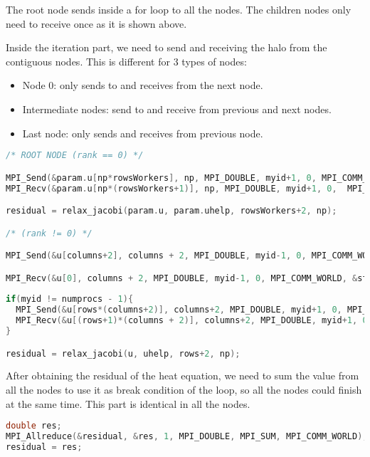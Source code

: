 \documentclass[a4paper, 10pt]{article}
\begin{document}
The root node sends inside a for loop to all the nodes. The children nodes only need to receive once as it is shown above.


Inside the iteration part, we need to send and receiving the halo from the contiguous nodes. This is different for 3 types of nodes:

\begin{itemize}
  \item Node 0: only sends to and receives from the next node.
  \item Intermediate nodes: send to and receive from previous and next nodes.
  \item Last node: only sends and receives from previous node.
\end{itemize}

\begin{lstlisting}[language=c, caption={Communications between nodes inside the iterations}]
/* ROOT NODE (rank == 0) */

MPI_Send(&param.u[np*rowsWorkers], np, MPI_DOUBLE, myid+1, 0, MPI_COMM_WORLD);
MPI_Recv(&param.u[np*(rowsWorkers+1)], np, MPI_DOUBLE, myid+1, 0,  MPI_COMM_WORLD, &status);

residual = relax_jacobi(param.u, param.uhelp, rowsWorkers+2, np); 

/* (rank != 0) */

MPI_Send(&u[columns+2], columns + 2, MPI_DOUBLE, myid-1, 0, MPI_COMM_WORLD);

MPI_Recv(&u[0], columns + 2, MPI_DOUBLE, myid-1, 0, MPI_COMM_WORLD, &status);
                    
if(myid != numprocs - 1){
  MPI_Send(&u[rows*(columns+2)], columns+2, MPI_DOUBLE, myid+1, 0, MPI_COMM_WORLD);
  MPI_Recv(&u[(rows+1)*(columns + 2)], columns+2, MPI_DOUBLE, myid+1, 0, MPI_COMM_WORLD, &status);
}

residual = relax_jacobi(u, uhelp, rows+2, np);
\end{lstlisting}

After obtaining the residual of the heat equation, we need to sum the value from all the nodes to use it as break condition of the loop, so all the nodes could finish at the same time. This part is identical in all the nodes.

\begin{lstlisting}[language=c, caption={Allreduce for residual value}]
double res;
MPI_Allreduce(&residual, &res, 1, MPI_DOUBLE, MPI_SUM, MPI_COMM_WORLD);
residual = res;
\end{lstlisting}
\end{document}
